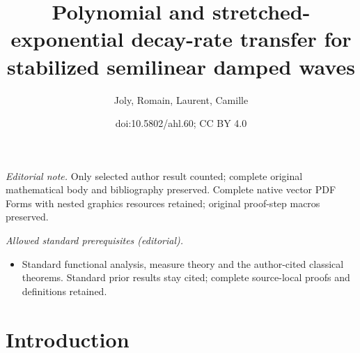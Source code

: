 \documentclass[10pt]{amsart}
\title{Polynomial and stretched-exponential decay-rate transfer for stabilized semilinear damped waves}
\author{Joly, Romain, Laurent, Camille}
\date{doi:10.5802/ahl.60; CC BY 4.0}
\theoremstyle{definition}\newtheorem{defi}[theo]{Definition}\newtheorem{rema}[theo]{Remark}\newtheorem{exam}[theo]{Example}\newtheorem{exem}[theo]{Example}\newtheorem{nota}[theo]{Notation}
\begin{document}
\maketitle
\noindent\textit{Editorial note.} Only selected author result counted; complete original mathematical body and bibliography preserved. Complete native vector PDF Forms with nested graphics resources retained; original proof-step macros preserved.\par\medskip
\noindent\textit{Allowed standard prerequisites (editorial).}\begin{itemize}
\item Standard functional analysis, measure theory and the author-cited classical theorems. Standard prior results stay cited; complete source-local proofs and definitions retained.
\end{itemize}\medskip


\section{Introduction}
\end{document}
